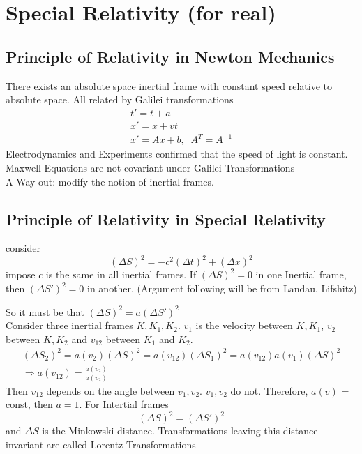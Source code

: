 \section{Special Relativity (for real)}

\subsection{Principle of Relativity in Newton Mechanics}
There exists an absolute space inertial frame with constant speed relative to absolute space. All related by Galilei transformations
\begin{gather}
	t' = t + a\\
	x' = x + vt\\
	x' = Ax + b, \;\; A^T = A^{-1}
\end{gather}
Electrodynamics and Experiments confirmed that the speed of light is constant. Maxwell Equations are not covariant under Galilei Transformations\\
A Way out: modify the notion of inertial frames.

\subsection{Principle of Relativity in Special Relativity}
consider $$(\Delta S)^2 = -c^2 (\Delta t)^2 + (\Delta x)^2$$
impose $c$ is the same in all inertial frames. If $(\Delta S)^2 = 0$ in one Inertial frame, then $(\Delta S')^2 = 0$ in another. (Argument following will be from Landau, Lifshitz)

So it must be that $(\Delta S)^2 = a(\Delta S')^2$\\
Consider three inertial frames $K, K_1, K_2$. $v_1$ is the velocity between $K,K_1$, $v_2$ between $K, K_2$ and $v_{12}$ between $K_1$ and $K_2$.
\begin{gather}
	(\Delta S_2)^2 = a(v_2) (\Delta S)^2 = a(v_{12}) (\Delta S_{1})^2 = a(v_{12})a(v_1)(\Delta S)^2\\
	\Rightarrow a(v_{12}) = \frac{a(v_2)}{a(v_2)}
\end{gather}
Then $v_{12}$ depends on the angle between $v_1,v_2$. $v_1,v_2$ do not. Therefore, $a(v)$ = const, then $a= 1$. For Intertial frames
\begin{equation}
	(\Delta S)^2 = (\Delta S')^2
\end{equation}
and $\Delta S$ is the Minkowski distance. Transformations leaving this distance invariant are called Lorentz Transformations

